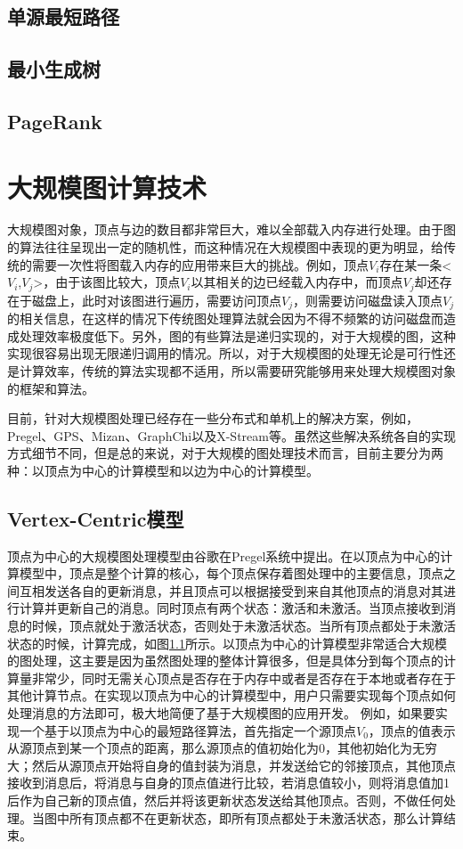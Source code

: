 \subsection{单源最短路径}



\subsection{最小生成树}

\subsection{PageRank}

\section{大规模图计算技术}

大规模图对象，顶点与边的数目都非常巨大，难以全部载入内存进行处理。由于图的算法往往呈现出一定的随机性，而这种情况在大规模图中表现的更为明显，给传统的需要一次性将图载入内存的应用带来巨大的挑战。例如，顶点$V_i$存在某一条<$V_i$,$V_j$>，由于该图比较大，顶点$V_i$以其相关的边已经载入内存中，而顶点$V_j$却还存在于磁盘上，此时对该图进行遍历，需要访问顶点$V_j$，则需要访问磁盘读入顶点$V_j$的相关信息，在这样的情况下传统图处理算法就会因为不得不频繁的访问磁盘而造成处理效率极度低下。另外，图的有些算法是递归实现的，对于大规模的图，这种实现很容易出现无限递归调用的情况。所以，对于大规模图的处理无论是可行性还是计算效率，传统的算法实现都不适用，所以需要研究能够用来处理大规模图对象的框架和算法。

目前，针对大规模图处理已经存在一些分布式和单机上的解决方案，例如，Pregel、GPS、Mizan、GraphChi以及X-Stream等。虽然这些解决系统各自的实现方式细节不同，但是总的来说，对于大规模的图处理技术而言，目前主要分为两种：以顶点为中心的计算模型和以边为中心的计算模型。

\subsection{Vertex-Centric模型}
顶点为中心的大规模图处理模型由谷歌在Pregel系统中提出。在以顶点为中心的计算模型中，顶点是整个计算的核心，每个顶点保存着图处理中的主要信息，顶点之间互相发送各自的更新消息，并且顶点可以根据接受到来自其他顶点的消息对其进行计算并更新自己的消息。同时顶点有两个状态：激活和未激活。当顶点接收到消息的时候，顶点就处于激活状态，否则处于未激活状态。当所有顶点都处于未激活状态的时候，计算完成，如图\ref{}所示。以顶点为中心的计算模型非常适合大规模的图处理，这主要是因为虽然图处理的整体计算很多，但是具体分到每个顶点的计算量非常少，同时无需关心顶点是否存在于内存中或者是否存在于本地或者存在于其他计算节点。在实现以顶点为中心的计算模型中，用户只需要实现每个顶点如何处理消息的方法即可，极大地简便了基于大规模图的应用开发。
例如，如果要实现一个基于以顶点为中心的最短路径算法，首先指定一个源顶点$V_0$，顶点的值表示从源顶点到某一个顶点的距离，那么源顶点的值初始化为0，其他初始化为无穷大；然后从源顶点开始将自身的值封装为消息，并发送给它的邻接顶点，其他顶点接收到消息后，将消息与自身的顶点值进行比较，若消息值较小，则将消息值加1后作为自己新的顶点值，然后并将该更新状态发送给其他顶点。否则，不做任何处理。当图中所有顶点都不在更新状态，即所有顶点都处于未激活状态，那么计算结束。

